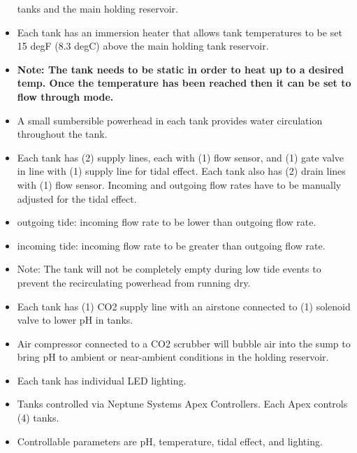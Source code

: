 \documentclass[]{book}
\begin{document}
\begin{itemize}
  tanks and the main holding reservoir.\\
\item
  Each tank has an immersion heater that allows tank temperatures to be
  set 15 degF (8.3 degC) above the main holding tank reservoir.\\
\item
  \textbf{Note: The tank needs to be static in order to heat up to a
  desired temp. Once the temperature has been reached then it can be set
  to flow through mode.}\\
\item
  A small sumbersible powerhead in each tank provides water circulation
  throughout the tank.\\
\item
  Each tank has (2) supply lines, each with (1) flow sensor, and (1)
  gate valve in line with (1) supply line for tidal effect. Each tank
  also has (2) drain lines with (1) flow sensor. Incoming and outgoing
  flow rates have to be manually adjusted for the tidal effect.\\
\item
  outgoing tide: incoming flow rate to be lower than outgoing flow
  rate.\\
\item
  incoming tide: incoming flow rate to be greater than outgoing flow
  rate.\\
\item
  Note: The tank will not be completely empty during low tide events to
  prevent the recirculating powerhead from running dry.\\
\item
  Each tank has (1) CO2 supply line with an airstone connected to (1)
  solenoid valve to lower pH in tanks.\\
\item
  Air compressor connected to a CO2 scrubber will bubble air into the
  sump to bring pH to ambient or near-ambient conditions in the holding
  reservoir.\\
\item
  Each tank has individual LED lighting.\\
\item
  Tanks controlled via Neptune Systems Apex Controllers. Each Apex
  controls (4) tanks.\\
\item
  Controllable parameters are pH, temperature, tidal effect, and
  lighting.
\end{itemize}
\end{document}
